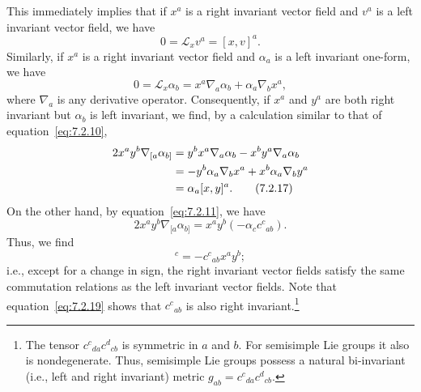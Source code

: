This immediately implies that if \(x^a\) is a right invariant vector field and
\(v^a\) is a left invariant vector field, we have
\begin{equation}
  0=\mathcal L_xv^a=[x,v]^a .
  \tag{7.2.15}\label{eq:7.2.15}
\end{equation}
Similarly, if \(x^a\) is a right invariant vector field and \(\alpha_a\) is a left
invariant one-form, we have
\begin{equation}
  0=\mathcal L_x\alpha_b
    =x^a\nabla_a\alpha_b+\alpha_a\nabla_bx^a ,
  \tag{7.2.16}\label{eq:7.2.16}
\end{equation}
where \(\nabla_a\) is any derivative operator. Consequently, if \(x^a\) and
\(y^a\) are both right invariant but \(\alpha_b\) is left invariant, we find, by a
calculation similar to that of equation~\eqref{eq:7.2.10},
\begin{align}
  2x^ay^b\nabla_{[a}\alpha_{b]}
    &=y^bx^a\nabla_a\alpha_b-x^by^a\nabla_a\alpha_b \notag\\
    &=-y^b\alpha_a\nabla_bx^a+x^b\alpha_a\nabla_by^a \notag\\
    &=\alpha_a[x,y]^a .
  \tag{7.2.17}\label{eq:7.2.17}
\end{align}
On the other hand, by equation~\eqref{eq:7.2.11}, we have
\begin{equation}
  2x^ay^b\nabla_{[a}\alpha_{b]}
    =x^ay^b(-\alpha_cc^c{}_{ab}) .
  \tag{7.2.18}\label{eq:7.2.18}
\end{equation}
Thus, we find
\begin{equation}
  [x,y]^c=-c^c{}_{ab}x^ay^b ;
  \tag{7.2.19}\label{eq:7.2.19}
\end{equation}
i.e., except for a change in sign, the right invariant vector fields satisfy the same
commutation relations as the left invariant vector fields. Note that
equation~\eqref{eq:7.2.19} shows that \(c^c{}_{ab}\) is also right
invariant.\footnote{The tensor \(c^c{}_{da}c^d{}_{cb}\) is symmetric in \(a\)
and \(b\). For semisimple Lie groups it also is nondegenerate. Thus, semisimple
Lie groups possess a natural bi-invariant (i.e., left and right invariant) metric
\(g_{ab}=c^c{}_{da}c^d{}_{cb}\).}

